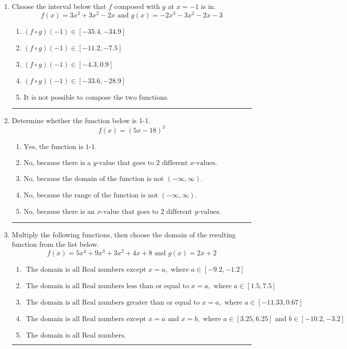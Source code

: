 \documentclass[14pt]{extbook}
\newcommand{\litem}[1]{\item#1\hspace*{-1cm}\rule{\textwidth}{0.4pt}}
\begin{document}
\begin{enumerate}
\litem{
Choose the interval below that $f$ composed with $g$ at $x=-1$ is in.\[ f(x) = 3x^{3} +3 x^{2} -2 x \text{ and } g(x) = -2x^{3} -3 x^{2} -2 x -3 \]\begin{enumerate}[label=\Alph*.]
\item \( (f \circ g)(-1) \in [-35.4, -34.9] \)
\item \( (f \circ g)(-1) \in [-11.2, -7.5] \)
\item \( (f \circ g)(-1) \in [-4.3, 0.9] \)
\item \( (f \circ g)(-1) \in [-33.6, -28.9] \)
\item \( \text{It is not possible to compose the two functions.} \)

\end{enumerate} }
\litem{
Determine whether the function below is 1-1.\[ f(x) = (5 x - 18)^3 \]\begin{enumerate}[label=\Alph*.]
\item \( \text{Yes, the function is 1-1.} \)
\item \( \text{No, because there is a $y$-value that goes to 2 different $x$-values.} \)
\item \( \text{No, because the domain of the function is not $(-\infty, \infty)$.} \)
\item \( \text{No, because the range of the function is not $(-\infty, \infty)$.} \)
\item \( \text{No, because there is an $x$-value that goes to 2 different $y$-values.} \)

\end{enumerate} }
\litem{
Multiply the following functions, then choose the domain of the resulting function from the list below.\[ f(x) = 5x^{4} +9 x^{3} +3 x^{2} +4 x + 8 \text{ and } g(x) = 2x + 2 \]\begin{enumerate}[label=\Alph*.]
\item \( \text{ The domain is all Real numbers except } x = a, \text{ where } a \in [-9.2, -1.2] \)
\item \( \text{ The domain is all Real numbers less than or equal to } x = a, \text{ where } a \in [1.5, 7.5] \)
\item \( \text{ The domain is all Real numbers greater than or equal to } x = a, \text{ where } a \in [-11.33, 0.67] \)
\item \( \text{ The domain is all Real numbers except } x = a \text{ and } x = b, \text{ where } a \in [3.25, 6.25] \text{ and } b \in [-10.2, -3.2] \)
\item \( \text{ The domain is all Real numbers. } \)


\end{enumerate}}
\end{enumerate}
\end{document}
